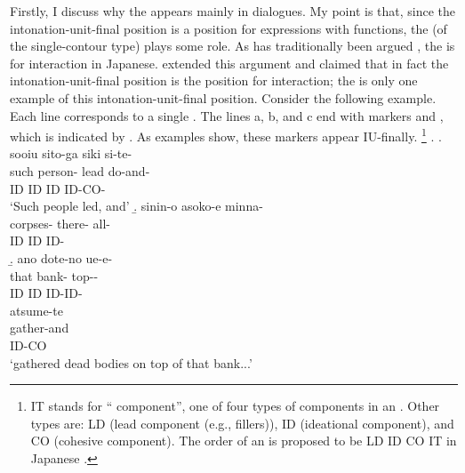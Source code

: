 Firstly, I discuss why the  appears mainly in dialogues.
My point is that,
since the intonation-unit-final position is a position for expressions with  functions,
the  (of the single-contour type) plays some  role.
As has traditionally been argued \cite[e.g.,][]{watanabe71},
the  is for interaction in Japanese.
 extended this argument and claimed that
in fact the intonation-unit-final position is the position for interaction;
the  is only one example of this intonation-unit-final position.
Consider the following example.
Each line corresponds to a single .
The lines a, b, and c end with  markers  and ,
which is indicated by .
As examples \Next show,
these  markers appear IU-finally.%
	\footnote{
	IT stands for `` component'',
	one of four types of components in an .
	Other types are:
	LD (lead component (e.g., fillers)),
	ID (ideational component), and
	CO (cohesive component).
	The order of an  is proposed to be
	LD ID CO IT in Japanese \cite[][44]{iwasaki93}.
	}
%
\ex.
 \a.
 \glll sooiu sito-ga siki si-te- \\
 	such person- lead do-and- \\
	ID ID ID ID-CO-	 \\
	\glt `Such people led, and'
 \b.
 \glll sinin-o asoko-e minna- \\
 		corpses- there- all- \\
		ID ID ID- \\
 \b.
 \glll ano dote-no ue-e- \\
 		that bank- top-- \\
		ID ID ID-ID- \\
 \glll atsume-te \\
 		gather-and \\
		ID-CO \\
	\glt `gathered dead bodies on top of that bank...'
	\hfill{\cite[][47, gloss and transcription modified by the current author]{iwasaki93}}

